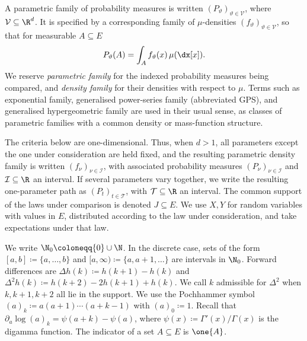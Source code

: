 \documentclass[11pt]{article}
\begin{document}
A parametric family of probability measures is written \((P_\vartheta)_{\vartheta\in\mathcal V}\), where \(\mathcal V\subseteq\R^d\). It is specified by a corresponding family of \(\mu\)-densities \((f_\vartheta)_{\vartheta\in\mathcal V}\), so that for measurable  $A\subseteq E$
\[
P_\vartheta(A)=\int_A f_\vartheta(x)\,\mu(\dx[x]).
\]
We reserve \emph{parametric family} for the indexed probability measures being compared, and \emph{density family} for their densities with respect to \(\mu\). Terms such as exponential family, generalised power-series family (abbreviated GPS), and generalised hypergeometric family are used in their usual sense, as classes of parametric families with a common density or mass-function structure.

The criteria below are one-dimensional. Thus, when \(d>1\), all parameters except the one under consideration are held fixed, and the resulting parametric density family is written \((f_\nu)_{\nu\in\mathcal I}\), with associated probability measures \((P_\nu)_{\nu\in\mathcal I}\) and \(\mathcal I\subseteq\R\) an interval. If several parameters vary together, we write the resulting one-parameter path as \((P_t)_{t\in\mathcal T}\), with \(\mathcal T\subseteq\R\) an interval. The common support of the laws under comparison is denoted \(J\subseteq E\). We use $X,Y$ for random variables with values in $E$, distributed according to the law under consideration, and take expectations under that law.

We write $\N_0\coloneqq \{0\}\cup\N$. In the discrete case, sets of the form $[a,b]\coloneqq \{a,\dots,b\}$ and $[a,\infty)\coloneqq \{a,a{+}1,\dots\}$ are intervals in $\N_0$. Forward differences are $\Delta h(k)\coloneqq h(k+1)-h(k)$ and $\Delta^2 h(k)\coloneqq h(k+2)-2h(k+1)+h(k)$. We call $k$ admissible for $\Delta^2$ when $k,k+1,k+2$ all lie in the support. We use the Pochhammer symbol $(a)_k\coloneqq a(a+1)\cdots(a+k-1)$ with $(a)_0\coloneqq 1$. Recall that $\partial_a\log(a)_k=\psi(a+k)-\psi(a)$, where $\psi(x)\coloneqq \Gamma'(x)/\Gamma(x)$  is the digamma function. 
The indicator of a set $A\subseteq E$ is $\one\{A\}$.
\end{document}
